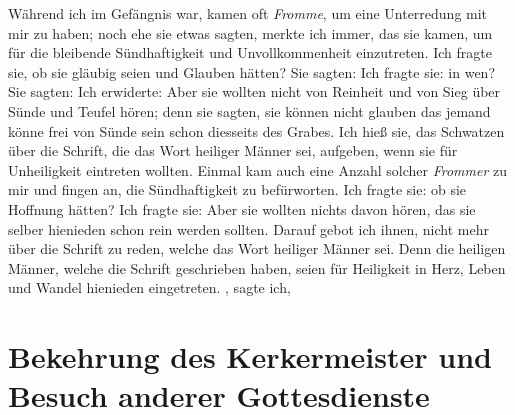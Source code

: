 Während ich im Gefängnis war, kamen oft \textit{Fromme}, um eine
Unterredung mit mir zu haben; noch ehe sie etwas sagten, merkte
ich immer, das sie kamen, um für die bleibende 
Sündhaftigkeit und 
Unvollkommenheit einzutreten. Ich 
fragte sie, ob sie gläubig seien und
Glauben hätten? Sie sagten:  Ich fragte sie: in wen?
Sie sagten:  Ich erwiderte:  Aber sie wollten nicht von Reinheit und von Sieg
über Sünde und Teufel hören; denn sie sagten, sie können nicht
glauben das jemand könne frei von Sünde sein schon diesseits
des Grabes. Ich hieß sie, das Schwatzen über die Schrift, die
das Wort heiliger Männer sei, aufgeben, wenn sie für Unheiligkeit
eintreten wollten. Einmal kam auch eine Anzahl solcher \textit{Frommer}
zu mir und fingen an, die Sündhaftigkeit zu befürworten. Ich
fragte sie: ob sie Hoffnung hätten?  Ich fragte sie:  Aber sie wollten nichts davon hören, das sie selber
hienieden schon rein werden sollten. Darauf gebot ich ihnen,
nicht mehr über die Schrift zu reden, welche das Wort heiliger
Männer sei. Denn die heiligen Männer, welche die Schrift 
geschrieben haben, seien für Heiligkeit in Herz, Leben und Wandel
hienieden eingetreten. , sagte ich, 


\section{Bekehrung des Kerkermeister und Besuch anderer Gottesdienste}

